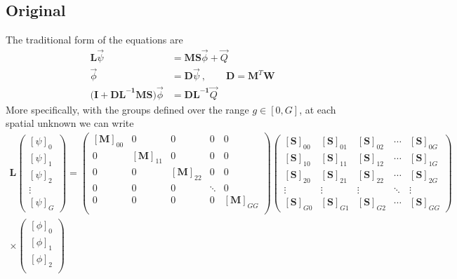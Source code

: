 \documentclass[12pt,twoside]{article}
\newcommand{\ve}[1]{\ensuremath{\mathbf{#1}}}
\begin{document}
\subsection*{Original}
The traditional form of the equations are
\begin{align}
\ve{L}\vec{\psi} &= \ve{MS}\vec{\phi} + \vec{Q}\\
\vec{\phi} &= \ve{D}\vec{\psi}\:, \qquad \ve{D} = \ve{M}^T\ve{W} \\
\bigl(\ve{I} + \ve{DL^{-1} MS}\bigr)\vec{\phi} &= \ve{DL^{-1}}\vec{Q} 
\end{align}
%
More specifically, with the groups defined over the range $g\in[0,G]$,
at each spatial unknown we can write
\begin{multline}
    \ve{L}
    \begin{pmatrix}
      [\psi]_0 \\
      [\psi]_1 \\
      [\psi]_2 \\
      \vdots   \\
      [\psi]_G
    \end{pmatrix} =
    \begin{pmatrix}
      [\ve{M}]_{00} & 0 & 0 & 0 & 0 \\
      0 & [\ve{M}]_{11} & 0 & 0 & 0 \\
      0 & 0 & [\ve{M}]_{22} & 0 & 0 \\
      0 & 0 & 0 & \ddots & 0 \\
      0 & 0 & 0 & 0 & [\ve{M}]_{GG} \\
    \end{pmatrix}
    \begin{pmatrix}
      [\ve{S}]_{00} & [\ve{S}]_{01} & [\ve{S}]_{02} & \cdots &
      [\ve{S}]_{0G} \\
      [\ve{S}]_{10} & [\ve{S}]_{11} & [\ve{S}]_{12} & \cdots &
      [\ve{S}]_{1G} \\
      [\ve{S}]_{20} & [\ve{S}]_{21} & [\ve{S}]_{22} & \cdots &
      [\ve{S}]_{2G} \\
      \vdots & \vdots & \vdots & \ddots & \vdots \\
      [\ve{S}]_{G0} & [\ve{S}]_{G1} & [\ve{S}]_{G2} & \cdots &
      [\ve{S}]_{GG}
    \end{pmatrix}\\
    \times
    \begin{pmatrix}
      [\phi]_0 \\
      [\phi]_1 \\
      [\phi]_2 \\

\end{pmatrix}
\end{multline}
\end{document}
